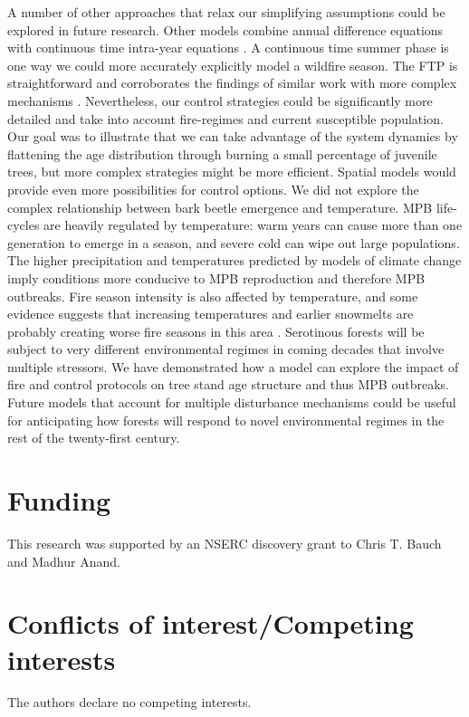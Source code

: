 A number of other approaches that relax our simplifying assumptions could be explored in future research. Other models combine annual difference equations with continuous time intra-year equations \cite{strohm2016impacts,lynch2006influence,casagrandi1999minimal}. A continuous time summer phase is one way we could more accurately explicitly model a wildfire season. The FTP is straightforward and corroborates the findings of similar work with more complex mechanisms \cite{strohm2016impacts}. Nevertheless, our control strategies could be significantly more detailed and take into account fire-regimes and current susceptible population. Our goal was to illustrate that we can take advantage of the system dynamics by flattening the age distribution through burning a small percentage of juvenile trees, but more complex strategies might be more efficient. Spatial models would provide even more possibilities for control options. We did not explore the complex relationship between bark beetle emergence and temperature. MPB life-cycles are heavily regulated by temperature: warm years can cause more than one generation to emerge in a season, and severe cold can wipe out large populations. The higher precipitation and temperatures predicted by models of climate change imply conditions more conducive to MPB reproduction and therefore MPB outbreaks. Fire season intensity is also affected by temperature, and some evidence suggests that increasing temperatures and earlier snowmelts are probably creating worse fire seasons in this area \cite{westerling2006warming}. 
\mdseries
Serotinous forests will be subject to very different environmental regimes in coming decades that involve multiple stressors. We have demonstrated how a model can explore the impact of fire and control protocols on tree stand age structure and thus MPB outbreaks. Future models that account for multiple disturbance mechanisms could be useful for anticipating how forests will respond to novel environmental regimes in the rest of the twenty-first century. 


\section*{Funding}
This research was supported by an NSERC discovery grant to Chris T. Bauch and Madhur Anand.


\section*{Conflicts of interest/Competing interests}
The authors declare no competing interests.

